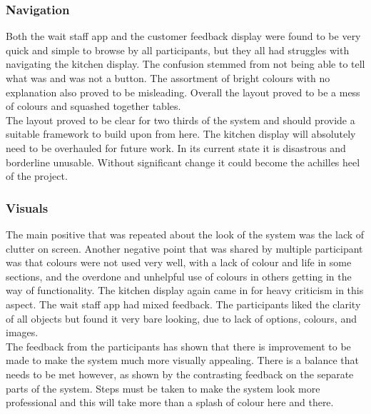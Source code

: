 \documentclass[11pt, a4paper]{report}
\begin{document}
\subsubsection{Navigation}

Both   the   wait   staff   app   and   the   customer   feedback   display   were   found   to   be   very quick   and   simple   to   browse   by   all   participants,   but   they   all   had   struggles   with navigating   the   kitchen   display.   The   confusion   stemmed   from   not   being   able   to   tell what   was   and   was   not   a   button.   The   assortment   of   bright   colours   with   no explanation   also   proved   to   be   misleading.   Overall   the   layout   proved   to   be   a   mess   of colours   and   squashed   together   tables.\\
The   layout   proved   to   be   clear   for   two   thirds   of   the   system   and   should   provide   a suitable   framework   to   build   upon   from   here.   The   kitchen   display   will   absolutely need   to   be   overhauled   for   future   work.   In   its   current   state   it   is   disastrous   and borderline   unusable.   Without   significant   change   it   could   become   the   achilles   heel   of the   project.\\
\subsubsection{Visuals} 
The   main   positive   that   was   repeated   about   the   look   of   the   system   was   the   lack   of clutter   on   screen.   Another   negative   point   that   was   shared   by   multiple   participant was   that   colours   were   not   used   very   well,   with   a   lack   of   colour   and   life   in   some sections,   and   the   overdone   and   unhelpful   use   of   colours   in   others   getting   in   the way   of   functionality.   The   kitchen   display   again   came   in   for   heavy   criticism   in   this aspect.   The   wait   staff   app   had   mixed   feedback.   The   participants   liked   the   clarity   of all   objects   but   found   it   very   bare   looking,   due   to   lack   of   options,   colours,   and images.\\
The   feedback   from   the   participants   has   shown   that   there   is   improvement   to   be made   to   make   the   system   much   more   visually   appealing.   There   is   a   balance   that needs   to   be   met   however,   as   shown   by   the   contrasting   feedback   on   the   separate parts   of   the   system.   Steps   must   be   taken   to   make   the   system   look   more professional   and   this   will   take   more   than   a   splash   of   colour   here   and   there.\\
\end{document}
